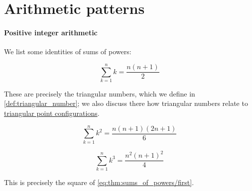 \section{Arithmetic patterns}\label{sec:arithmetic_patterns}

\paragraph{Positive integer arithmetic}

\begin{proposition}\label{thm:sums_of_powers}
  We list some identities of sums of powers:
  \begin{thmenum}
    \begin{equation}\label{eq:thm:sums_of_powers/first}
      \sum_{k=1}^n k = \frac {n (n+1)} 2
    \end{equation}

    These are precisely the triangular numbers, which we define in \cref{def:triangular_number}; we also discuss there how triangular numbers relate to \hyperref[def:triangular_point_configuration]{triangular point configurations}.

    \begin{equation}\label{eq:thm:sums_of_powers/second}
      \sum_{k=1}^n k^2 = \frac {n (n+1) (2n + 1)} 6
    \end{equation}

    \begin{equation}\label{eq:thm:sums_of_powers/third}
      \sum_{k=1}^n k^3 = \frac {n^2 (n+1)^2} 4
    \end{equation}

    This is precisely the square of \eqref{eq:thm:sums_of_powers/first}.
  \end{thmenum}
\end{proposition}
